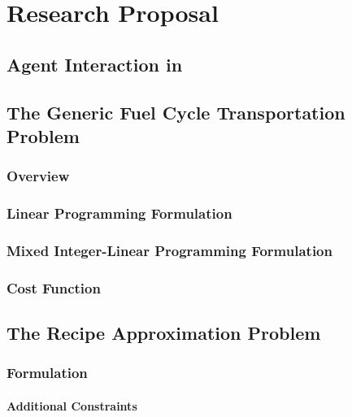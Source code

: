 \chapter{Research Proposal}\label{ch:research}



\section{Agent Interaction in \Cyclus}\label{sec:agent-interaction}


\section{The Generic Fuel Cycle Transportation Problem}\label{sec:gfctp}

\subsection{Overview}



\subsection{Linear Programming Formulation}



\subsection{Mixed Integer-Linear Programming Formulation}



\subsection{Cost Function}\label{sec:cost-function}



\section{The Recipe Approximation Problem}\label{sec:rap}



\subsection{Formulation}



\subsubsection{Additional Constraints}


